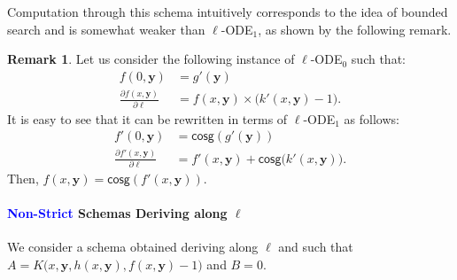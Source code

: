 \documentclass[11pt, oneside]{article}
\newcommand{\fun}[1]{\mathsf{#1}}
\newcommand{\Nat}{\mathbb{N}}
\newcommand{\AC}{\mathbf{FAC}}
\newcommand{\tu}[1]{\mathbf{#1}}
\newtheorem{lemma}{Lemma}
\theoremstyle{definition}
\newtheorem{remark}{Remark}
\begin{document}
{\noindent
Computation through this schema intuitively corresponds to the idea of bounded search and is somewhat weaker than $\ell$-ODE$_1$, as shown by the following remark.

\begin{remark}
    Let us consider the following instance of $\ell$-ODE$_0$ such that:
    \begin{align*}
        f(0, \tu y) &= g'(\tu y) \\
        \frac{\partial f(x, \tu y)}{\partial \ell} &= f(x, \tu y) \times \big(k'(x, \tu y) - 1\big).
    \end{align*}
    It is easy to see that it can be rewritten in terms of $\ell$-ODE$_1$ as follows:
    \begin{align*}
        f'(0, \tu y) &= \fun{cosg}(g'(\tu y)) \\
        \frac{\partial f'(x, \tu y)}{\partial \ell} &= f'(x, \tu y) + \fun{cosg}\big(k'(x, \tu y)\big).
    \end{align*}
    Then, $f(x, \tu y)=\fun{cosg}(f'(x, \tu y))$.
\end{remark}

\paragraph{\textcolor{blue}{Non-Strict} Schemas Deriving along $\ell$}

We consider a schema obtained deriving along $\ell$ and such that $A= K\big(x, \tu y, h(x, \tu y), f(x, \tu y) - 1\big)$ and $B=0$.



}
\end{document}
